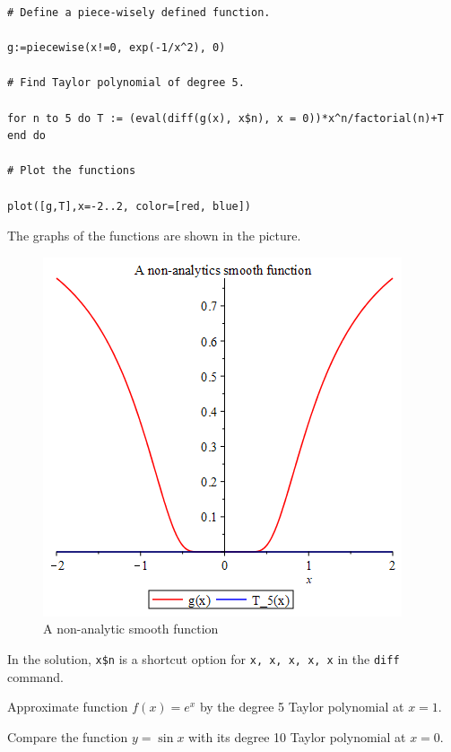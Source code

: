 \documentclass[en,11pt,simple]{elegantbook}
\let\BeginKnitrBlock\begin \let\EndKnitrBlock\end
\begin{document}
\BeginKnitrBlock{solution}{}{}
{}

\begin{verbatim}
# Define a piece-wisely defined function.

g:=piecewise(x!=0, exp(-1/x^2), 0)

# Find Taylor polynomial of degree 5.

for n to 5 do T := (eval(diff(g(x), x$n), x = 0))*x^n/factorial(n)+T end do

# Plot the functions

plot([g,T],x=-2..2, color=[red, blue])
\end{verbatim}

The graphs of the functions are shown in the picture.

\begin{figure}
\centering
\includegraphics[width=\textwidth,height=0.3\textheight]{figs/non-analytic-smooth.png}
\caption{A non-analytic smooth function}
\end{figure}
\EndKnitrBlock{solution}

In the solution, \texttt{x\$n} is a shortcut option for \texttt{x,\ x,\ x,\ x,\ x} in the \texttt{diff} command.

\BeginKnitrBlock{exercise}{}{}
\protect\hypertarget{exr:unnamed-chunk-240}{}{\label{exr:unnamed-chunk-240} }
Approximate function \(f(x)=e^x\) by the degree 5 Taylor polynomial at \(x=1\).
\EndKnitrBlock{exercise}

\BeginKnitrBlock{exercise}{}{}
\protect\hypertarget{exr:unnamed-chunk-241}{}{\label{exr:unnamed-chunk-241} }
Compare the function \(y=\sin x\) with its degree 10 Taylor polynomial at \(x=0\).
\EndKnitrBlock{exercise}


\end{document}
